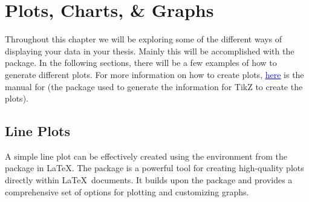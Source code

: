 \chapter{Plots, Charts, \& Graphs}\label{ch:plotsandgraphs}
		Throughout this chapter we will be exploring some of the different ways of displaying your data in your thesis.
		Mainly this will be accomplished with the  package.
		In the following sections, there will be a few examples of how to generate different plots.
		For more information on how to create plots, \href{https://mirror.its.dal.ca/ctan/graphics/pgf/contrib/pgfplots/doc/pgfplots.pdf}{\textcolor{blue}{\underline{here}}} is the manual for (the package used to generate the information for TikZ to create the plots).

	\section{Line Plots}
		A simple line plot can be effectively created using the  environment from the  package in \LaTeX. 
		The  package is a powerful tool for creating high-quality plots directly within \LaTeX\ documents. 
		It builds upon the  package and provides a comprehensive set of options for plotting and customizing graphs.


